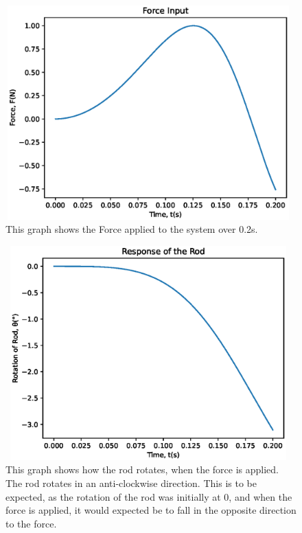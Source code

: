 \documentclass[a4paper,10pt,reqno]{article}
\numberwithin{equation}{section}
\begin{document}
\begin{figure}[H]
\centering
\includegraphics[width=11cm, height=8.25cm]{Force_Input.eps}
\caption
{This graph shows the Force applied to the system over 0.2s.}
\end{figure}

\begin{figure}[H]
\centering
\includegraphics[width=11cm, height=8.25cm]{Response_Rod.eps}
\caption
{This graph shows how the rod rotates, when the force is applied. The rod rotates in an anti-clockwise direction. This is to be expected, as the rotation of the rod was initially at 0\degree, and when the force  is applied, it would expected be to fall in the opposite direction to the force.}
\end{figure}
\end{document}
